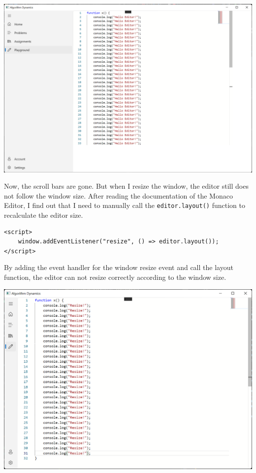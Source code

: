 \documentclass[a4paper]{report}
\begin{document}
\includegraphics[width=\textwidth, height=\textheight, keepaspectratio]{PlaygroundPage-WebView2-ResizeFailed}

Now, the scroll bars are gone. But when I resize the window, the editor still does not follow the window size. After reading the documentation of the Monaco Editor, I find out that I need to manually call the \texttt{editor.layout()} function to recalculate the editor size.

\begin{verbatim}
<script>
    window.addEventListener("resize", () => editor.layout());
</script>
\end{verbatim}

By adding the event handler for the window resize event and call the layout function, the editor can not resize correctly according to the window size.

\includegraphics[width=\textwidth, height=\textheight, keepaspectratio]{PlaygroundPage-WebView2-ResizeSuccess}
\end{document}
